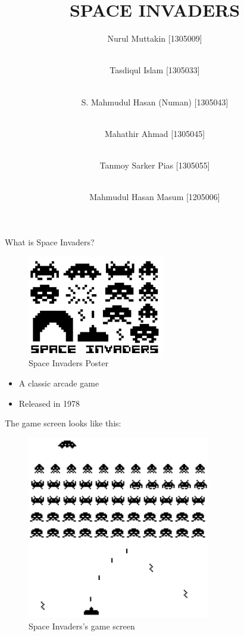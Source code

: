 \documentclass[15pt]{beamer}
\title{SPACE INVADERS}
\author[Muttakin \and Tasdiq \and Numan \and Mahathir \and Pias \and Masum]
{Nurul Muttakin [1305009] 
\and \\ Tasdiqul Islam [1305033]
\and \\ S. Mahmudul Hasan (Numan) [1305043]
\and \\ Mahathir Ahmad [1305045]
\and \\ Tanmoy Sarker Pias [1305055]
\and \\ Mahmudul Hasan Masum [1205006]
}
\institute[BUET]{Bangladesh University of Engineering and Technology}
\date{}
\begin{document}
\begin{frame}
\titlepage
\end{frame}

\begin{frame}
What is Space Invaders?

	\begin{figure}[ht!]
		\centering
		\includegraphics[width=60mm]{basic-invaders_2_2.jpg}
		\caption{Space Invaders Poster}
	\end{figure}


    \begin{itemize}
        \item A classic arcade game 
        \item Released in 1978
    \end{itemize}
\end{frame}

\begin{frame}
The game screen looks like this:
\begin{figure}[ht!]
\centering
\includegraphics[width=80mm]{space_invaders_screen_2.png}
\caption{Space Invaders's game screen}
\end{figure}
\end{frame}
\end{document}
